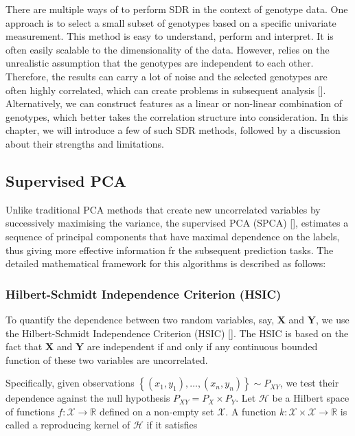 \documentclass[a4paper,12pt]{article}
\begin{document}
There are multiple ways of to perform SDR in the context of genotype data. One approach is to select a small subset of genotypes based on a specific univariate measurement. This method is easy to understand, perform and interpret. It is often easily scalable to the dimensionality of the data. However, relies on the unrealistic assumption that the genotypes are independent to each other. Therefore, the results can carry a lot of noise and the selected genotypes are often highly correlated, which can create problems in subsequent analysis [\cite{wang2011dimension}]. Alternatively, we can construct features as a linear or non-linear combination of genotypes, which better takes the correlation structure into consideration. In this chapter, we will introduce a few of such SDR methods, followed by a discussion about their strengths and limitations. 
%
%
%
%
%
%

\subsection{Supervised PCA} \label{Supervised PCA}
Unlike traditional PCA methods that create new uncorrelated variables by successively maximising the variance, the supervised PCA (SPCA)  [\cite{barshan2011supervised}], estimates a sequence of principal components that have maximal dependence on the labels, thus giving more effective information fr the subsequent prediction tasks. The detailed mathematical framework for this algorithms is described as follows:

\subsubsection{Hilbert-Schmidt Independence Criterion (HSIC)}  
To quantify the dependence between two random variables, say, $\boldsymbol{X}$ and $\boldsymbol{Y}$, we use the Hilbert-Schmidt Independence Criterion (HSIC) [\cite{gretton2005measuring}]. The HSIC is based on the fact that $\boldsymbol{X}$ and $\boldsymbol{Y}$ are independent if and only if any continuous bounded function of these two variables are uncorrelated. 

Specifically, given observations $\left\{\left(x_{1}, y_{1}\right), \ldots,\left(x_{n}, y_{n}\right)\right\} \sim P_{XY}$, we test their dependence against the null hypothesis $P_{XY} = P_{X} \times P_{Y}$. Let $\mathcal{H}$ be a Hilbert space of functions $f: \mathcal{X} \rightarrow \mathbb{R}$ defined on a non-empty set $\mathcal{X}$. A function $k: \mathcal{X} \times \mathcal{X} \rightarrow \mathbb{R}$ is called a reproducing kernel of $\mathcal{H}$ if it satisfies
\end{document}
